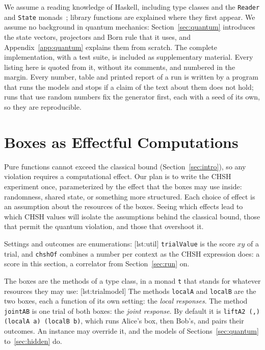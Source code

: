 \documentclass[11pt]{article}
\newcommand{\hs}{\lstinline[style=hask,basicstyle=\ttfamily,frame=none]}
\begin{document}
We assume a reading knowledge of Haskell, including type classes and the \hs|Reader| and \hs|State| monads~\citep{Hutton2016}; library functions are explained where they first appear. We assume no background in quantum mechanics: Section~\ref{sec:quantum} introduces the state vectors, projectors and Born rule that it uses, and Appendix~\ref{app:quantum} explains them from scratch. The complete implementation, with a test suite, is included as supplementary material. Every listing here is quoted from it, without its comments, and numbered in the margin. Every number, table and printed report of a run is written by a program that runs the models and stops if a claim of the text about them does not hold; runs that use random numbers fix the generator first, each with a seed of its own, so they are reproducible.

\section{Boxes as Effectful Computations}\label{sec:boxes}

Pure functions cannot exceed the classical bound (Section~\ref{sec:intro}), so any violation requires a computational effect. Our plan is to write the CHSH experiment once, parameterized by the effect that the boxes may use inside: randomness, shared state, or something more structured. Each choice of effect is an assumption about the resources of the boxes. Seeing which effects lead to which CHSH values will isolate the assumptions behind the classical bound, those that permit the quantum violation, and those that overshoot it.

Settings and outcomes are enumerations:
[lst:util]
\hs|trialValue| is the score $xy$ of a trial, and \hs|chshOf| combines a number per context as the CHSH expression does: a score in this section, a correlator from Section~\ref{sec:run} on.

The boxes are the methods of a type class, in a monad \hs|t| that stands for whatever resources they may use:
[lst:trialmodel]
The methods \hs|localA| and \hs|localB| are the two boxes, each a function of its own setting: the \emph{local responses}. The method \hs|jointAB| is one trial of both boxes: the \emph{joint response}. By default it is \hs|liftA2 (,) (localA a) (localB b)|, which runs Alice's box, then Bob's, and pairs their outcomes. An instance may override it, and the models of Sections~\ref{sec:quantum} to~\ref{sec:hidden} do.
\end{document}
